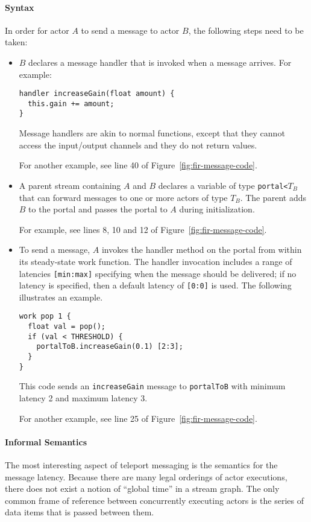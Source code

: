 \paragraph*{Syntax}  In order for actor $A$ to send a message to
actor $B$, the following steps need to be taken:
\begin{itemize}

\item $B$ declares a message handler that is invoked when a
message arrives.  For example: {\small
\vspace{-5pt}
\begin{verbatim}
handler increaseGain(float amount) {
  this.gain += amount;
}
\end{verbatim}
\vspace{-5pt}}
Message handlers are akin to normal functions, except that they
cannot access the input/output channels and they do not return values.

For another example, see line 40 of Figure~\ref{fig:fir-message-code}.

\item A parent stream containing $A$ and $B$ declares a variable of
type {\tt portal<}$T_B$\hspace{-1pt}{\tt >} that can forward messages
to one or more actors of type $T_B$.  The parent adds $B$ to the
portal and passes the portal to $A$ during initialization.

For example, see lines 8, 10 and 12 of Figure~\ref{fig:fir-message-code}.

\item To send a message, $A$ invokes the handler method on the portal
from within its steady-state work function. The handler invocation
includes a range of latencies {\tt [min:max]} specifying when the
message should be delivered; if no latency is specified, then a
default latency of {\tt [0:0]} is used.  The following illustrates an
example.{\small
\vspace{-5pt}
\begin{verbatim}
work pop 1 {
  float val = pop();
  if (val < THRESHOLD) {
    portalToB.increaseGain(0.1) [2:3];
  }
}
\end{verbatim}\vspace{-5pt}}
This code sends an {\tt increaseGain} message to {\tt portalToB} with
minimum latency 2 and maximum latency 3.

For another example, see line 25 of Figure~\ref{fig:fir-message-code}.
\end{itemize}
\paragraph*{Informal Semantics} The most interesting aspect of teleport
messaging is the semantics for the message latency.  Because there
are many legal orderings of actor executions, there does not exist a
notion of ``global time'' in a stream graph.  The only common frame of
reference between concurrently executing actors is the series of data
items that is passed between them.

